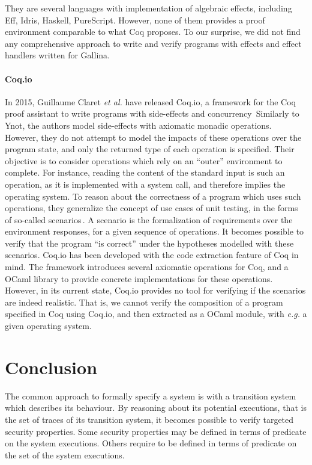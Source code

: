 They are several languages with implementation of algebraic effects, including
Eff, Idris, Haskell, PureScript.
%
However, none of them provides a proof environment comparable to what Coq
proposes.
%
To our surprise, we did not find any comprehensive approach to write and verify
programs with effects and effect handlers written for {\sc Gallina}.

\paragraph{Coq.io}
%
In 2015, Guillaume Claret \emph{et al.} have released Coq.io, a framework for
the Coq proof assistant to write programs with side-effects and
concurrency\,\cite{claret2015coqiowww}
%
Similarly to Ynot, the authors model side-effects with axiomatic monadic
operations.
%
However, they do not attempt to model the impacts of these operations over the
program state, and only the returned type of each operation is specified.
%
Their objective is to consider operations which rely on an ``outer'' environment
to complete.
%
For instance, reading the content of the standard input is such an operation, as
it is implemented with a system call, and therefore implies the operating
system.
%
To reason about the correctness of a program which uses such operations, they
generalize the concept of use cases of unit testing, in the forms of so-called
scenarios\,\cite{claret2015coqio}.
%
A scenario is the formalization of requirements over the environment responses,
for a given sequence of operations.
%
It becomes possible to verify that the program ``is correct'' under the
hypotheses modelled with these scenarios.
%
Coq.io has been developed with the code extraction feature of Coq in mind.
%
The framework introduces several axiomatic operations for Coq, and a OCaml
library to provide concrete implementations for these operations.
%
However, in its current state, Coq.io provides no tool for verifying if the
scenarios are indeed realistic.
%
That is, we cannot verify the composition of a program specified in Coq using
Coq.io, and then extracted as a OCaml module, with \emph{e.g.} a given operating
system.

\section{Conclusion} %

The common approach to formally specify a system is with a transition system
which describes its behaviour.
%
By reasoning about its potential executions, that is the set of traces of its
transition system, it becomes possible to verify targeted security properties.
%
Some security properties may be defined in terms of predicate on the system
executions.
%
Others require to be defined in terms of predicate on the set of the system
executions.

